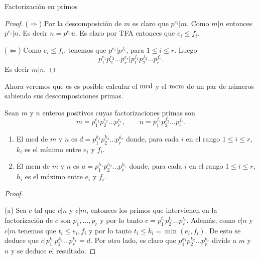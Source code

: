 \begin{section}{Factorización en primos}
\begin{proof}
\noindent($\Rightarrow$) Por la descomposición de $m$ es claro que $p^{e_i}|m$. Como $m|n$ entonces   $p^{e_i}|n$. Es decir $n =  p^{e_i}u$. Es claro por TFA entonces que $e_i \le f_i$.

\noindent($\Leftarrow$) Como $e_i \le f_i$, tenemos que $p^{e_i}|p^{f_i}$, para $1 \le i \le r$.  Luego  $$p_1^{e_1}p_2^{e_2}\ldots p_r^{e_r}| p_1^{f_1}p_2^{f_2}\ldots p_r^{f_r}.$$ Es decir $m|n$.
\end{proof}


%


Ahora veremos que es es posible calcular el $\operatorname{mcd}$ y el $\operatorname{mcm}$ de un par de números sabiendo sus descomposiciones primas.

\begin{proposicion}
Sean $m$ y $n$ enteros positivos cuyas factorizaciones primas son
$$
m=p_1^{e_1}p_2^{e_2}\ldots p_r^{e_r},\qquad
n=p_1^{f_1}p_2^{f_2}\ldots p_r^{f_r}.
$$
\begin{enumerate}[label=(\alph*)]
\item El mcd de $m$ y $n$ es $d=p_1^{k_1}p_2^{k_2}\ldots
p_r^{k_r}$ donde, para cada $i$ en el rango $1\le i \le r$, $k_i$
es el mínimo entre $e_i$ y $f_i$.
\item El mcm de $m$ y $n$ es $u=p_1^{h_1}p_2^{h_2}\ldots
p_r^{h_r}$ donde, para cada $i$ en el rango $1\le i \le r$, $h_i$
es el máximo entre $e_i$ y $f_i$.
\end{enumerate}
\end{proposicion}
\begin{proof}
\

\noindent(a) Sea $c$ tal que $c|n$ y $c|m$, entonces los primos que intervienen en la factorización de $c$ son $p_1,\ldots,p_r$ y por lo tanto $c =  p_1^{t_1}p_2^{t_2}\ldots p_r^{t_r}$. Además, como $c|n$ y $c|m$ tenemos que $t_i \le e_i,f_i$ y por lo tanto $t_i \le k_i = \min(e_i,f_i)$. De esto se deduce que $c|p_1^{k_1}p_2^{k_2}\ldots p_r^{k_r}=d$. Por otro lado, es claro  que  $p_1^{k_1}p_2^{k_2}\ldots p_r^{k_r}$ divide a $m$ y $n$ y se deduce el resultado.


\end{proof}
\end{section}

